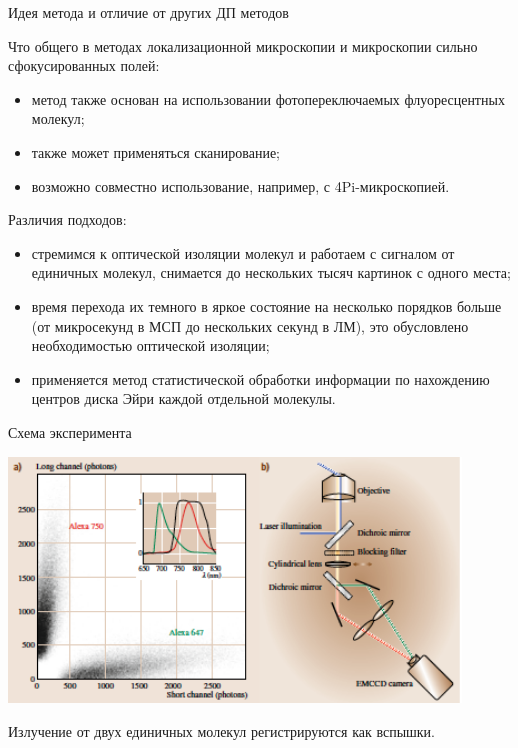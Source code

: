 \documentclass[9pt, compress, xcolor=table]{beamer}
\begin{document}
\begin{frame}{Идея метода и отличие от других ДП методов}

Что общего в методах локализационной микроскопии и микроскопии сильно сфокусированных полей:
\begin{itemize}
\item  метод также основан на использовании фотопереключаемых флуоресцентных молекул;
\item также может применяться сканирование;
\item возможно совместно использование, например, с 4Pi-микроскопией.
\end{itemize}

Различия подходов:
\begin{itemize}
\item  стремимся к оптической изоляции молекул и работаем с сигналом от единичных молекул, снимается до нескольких тысяч картинок с одного места;
\item время перехода их темного в яркое состояние на несколько порядков больше  (от микросекунд в МСП до нескольких секунд в ЛМ), это обусловлено необходимостью оптической изоляции;
\item применяется метод статистической обработки информации по нахождению центров диска Эйри каждой отдельной молекулы.
\end{itemize}

\end{frame}

\begin{frame}{Схема эксперимента}

\begin{center}
\includegraphics[width=0.9\textwidth]{lm21}
\end{center}

Излучение от двух единичных молекул регистрируются как вспышки.
\end{frame}
\end{document}
